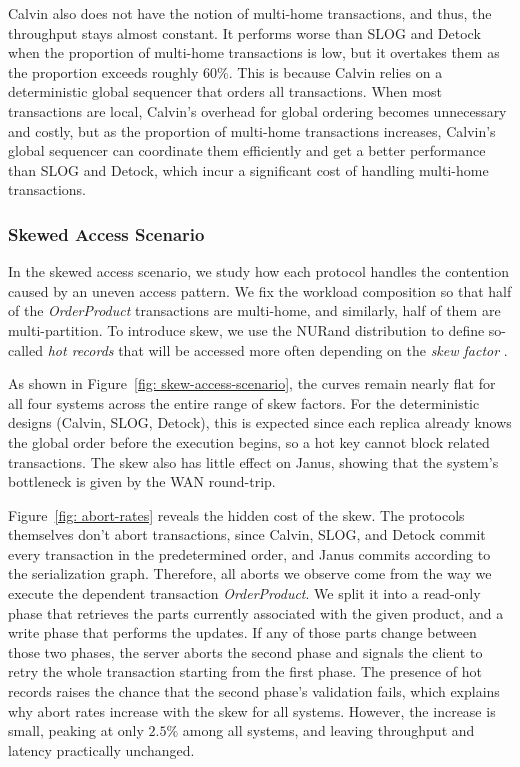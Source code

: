 Calvin also does not have the notion of multi-home transactions, and thus, the throughput stays almost constant. It performs worse than SLOG and Detock when the proportion of multi-home transactions is low, but it overtakes them as the proportion exceeds roughly $60\%$. This is because Calvin relies on a deterministic global sequencer that orders all transactions. When most transactions are local, Calvin's overhead for global ordering becomes unnecessary and costly, but as the proportion of multi-home transactions increases, Calvin's global sequencer can coordinate them efficiently and get a better performance than SLOG and Detock, which incur a significant cost of handling multi-home transactions.

\subsubsection{Skewed Access Scenario}
\label{subsubsec: skew-access-scenario}
In the skewed access scenario, we study how each protocol handles the contention caused by an uneven access pattern. We fix the workload composition so that half of the \textit{OrderProduct} transactions are multi-home, and similarly, half of them are multi-partition. To introduce skew, we use the NURand distribution to define so-called \textit{hot records} that will be accessed more often depending on the \textit{skew factor} \cite{council2010tpc}.

As shown in Figure~\ref{fig: skew-access-scenario}, the curves remain nearly flat for all four systems across the entire range of skew factors. For the deterministic designs (Calvin, SLOG, Detock), this is expected since each replica already knows the global order before the execution begins, so a hot key cannot block related transactions. The skew also has little effect on Janus, showing that the system's bottleneck is given by the WAN round-trip.

Figure~\ref{fig: abort-rates} reveals the hidden cost of the skew. The protocols themselves don't abort transactions, since Calvin, SLOG, and Detock commit every transaction in the predetermined order, and Janus commits according to the serialization graph. Therefore, all aborts we observe come from the way we execute the dependent transaction \textit{OrderProduct}. We split it into a read-only phase that retrieves the parts currently associated with the given product, and a write phase that performs the updates. If any of those parts change between those two phases, the server aborts the second phase and signals the client to retry the whole transaction starting from the first phase. The presence of hot records raises the chance that the second phase's validation fails, which explains why abort rates increase with the skew for all systems. However, the increase is small, peaking at only $2.5\%$ among all systems, and leaving throughput and latency practically unchanged.

